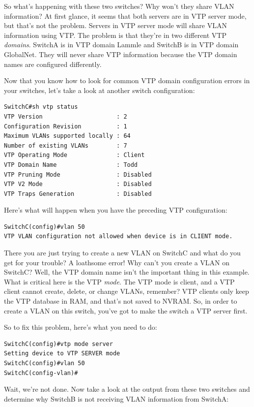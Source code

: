 So what's happening with these two switches? Why won't they share VLAN
information? At first glance, it seems that both servers are in VTP
server mode, but that's not the problem. Servers in VTP server mode will
share VLAN information using VTP. The problem is that they're in two
different VTP \emph{domains}. SwitchA is in VTP domain Lammle and SwitchB
is in VTP domain GlobalNet. They will never share VTP information
because the VTP domain names are configured differently.

Now that you know how to look for common VTP domain configuration errors
in your switches, let's take a look at another switch configuration:

\begin{verbatim}
SwitchC#sh vtp status
VTP Version                     : 2
Configuration Revision          : 1
Maximum VLANs supported locally : 64
Number of existing VLANs        : 7
VTP Operating Mode              : Client
VTP Domain Name                 : Todd
VTP Pruning Mode                : Disabled
VTP V2 Mode                     : Disabled
VTP Traps Generation            : Disabled
\end{verbatim}

Here's what will happen when you have the preceding VTP configuration:

\begin{verbatim}
SwitchC(config)#vlan 50
VTP VLAN configuration not allowed when device is in CLIENT mode.
\end{verbatim}

There you are just
trying to create a new VLAN on SwitchC and what do you get for your
trouble? A loathsome error! Why can't you create a VLAN on SwitchC?
Well, the VTP domain name isn't the important thing in this example.
What is critical here is the VTP \emph{mode}. The VTP mode is client,
and a VTP client cannot create, delete, or change VLANs, remember? VTP
clients only keep the VTP database in RAM, and that's not saved to
NVRAM. So, in order to create a VLAN on this switch, you've got to make
the switch a VTP server first.

So to fix this problem, here's what you need to do:

\begin{verbatim}
SwitchC(config)#vtp mode server
Setting device to VTP SERVER mode
SwitchC(config)#vlan 50
SwitchC(config-vlan)#
\end{verbatim}

Wait, we're not done. Now take a look at the output from these two
switches and determine why SwitchB is not receiving VLAN information
from SwitchA:

